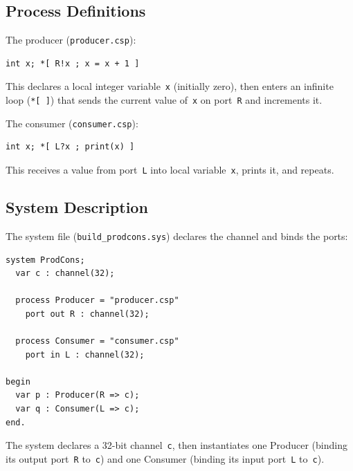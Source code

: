 \documentclass[11pt]{article}
\begin{document}
\subsection{Process Definitions}

The producer (\texttt{producer.csp}):

\begin{lstlisting}
int x; *[ R!x ; x = x + 1 ]
\end{lstlisting}

This declares a local integer variable~\texttt{x} (initially zero),
then enters an infinite loop (\texttt{*[\,]}) that sends the current
value of~\texttt{x} on port~\texttt{R} and increments it.

The consumer (\texttt{consumer.csp}):

\begin{lstlisting}
int x; *[ L?x ; print(x) ]
\end{lstlisting}

This receives a value from port~\texttt{L} into local
variable~\texttt{x}, prints it, and repeats.

\subsection{System Description}

The system file (\texttt{build\_prodcons.sys}) declares the channel
and binds the ports:

\begin{lstlisting}
system ProdCons;
  var c : channel(32);

  process Producer = "producer.csp"
    port out R : channel(32);

  process Consumer = "consumer.csp"
    port in L : channel(32);

begin
  var p : Producer(R => c);
  var q : Consumer(L => c);
end.
\end{lstlisting}

The system declares a 32-bit channel~\texttt{c}, then instantiates
one Producer (binding its output port~\texttt{R} to~\texttt{c}) and
one Consumer (binding its input port~\texttt{L} to~\texttt{c}).

\end{document}
